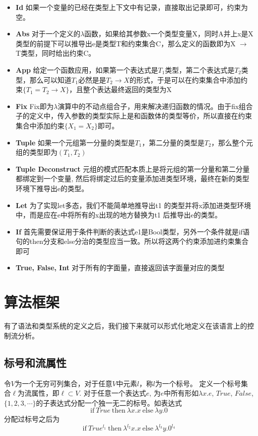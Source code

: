 \documentclass[12pt, titlepage]{article}
\begin{document}
	\begin{itemize}
		\item \textbf{Id} 如果一个变量的已经在类型上下文中有记录，直接取出记录即可，约束为空。
		\item \textbf{Abs} 对于一个定义的$\lambda$函数，如果给其参数x一个类型变量X，同时A并上x是X类型的前提下可以推导出e是类型T和约束集合C，那么定义的函数即为X $\to$ T类型，同时给出约束C。
		\item \textbf{App} 给定一个函数应用，如果第一个表达式是$T_1$类型，第二个表达式是$T_2$类型，那么可以知道$T_1$必然是是$T_2\to X$的形式，于是可以在约束集合中添加约束$\{T_1 = T_2\to X\}$，且整个表达最终返回的类型为X
		\item\textbf{Fix} Fix即为$\lambda$演算中的不动点组合子，用来解决递归函数的情况。由于fix组合子的定义中，传入参数的类型实际上是和函数体的类型等价，所以直接在约束集合中添加约束$\{X_1 = X_2\}$即可。
		\item\textbf{Tuple} 如果一个元组第一分量的类型是$T_1$，第二分量的类型是$T_2$，那么整个元组的类型即为$(T_1, T_2)$
		\item\textbf{Tuple Deconstruct} 元组的模式匹配本质上是将元组的第一分量和第二分量都绑定到一个变量, 然后将绑定过后的变量添加进类型环境，最终在新的类型环境下推导出e的类型。
		\item\textbf{Let} 为了实现let多态，我们不能简单地推导出t1 的类型并将x添加进类型环境中，而是应在e中将所有的x出现的地方替换为t1 后推导出e的类型。
		\item\textbf{If} 首先需要保证用于条件判断的表达式e1是Bool类型，另外一个条件就是if语句的then分支和else分治的类型应当一致。所以将这两个约束添加进约束集合即可
		\item\textbf{True, False, Int} 对于所有的字面量，直接返回该字面量对应的类型
	\end{itemize}
	
\section{算法框架}
有了语法和类型系统的定义之后，我们接下来就可以形式化地定义在该语言上的控制流分析。
\subsection{标号和流属性}
	令$V$为一个无穷可列集合，对于任意$V$中元素$l$，称$l$为一个标号。 定义一个标号集合$\ell$为流属性，即$\ell\subset V$. 对于任意一个表达式$e$, 为$e$中所有形如$\lambda x.e$, $True$, $False$, $\{1, 2, 3,\cdots\}$的子表达式分配一个独一无二的标号。如表达式$$\mathrm{if}\ True\ \mathrm{then}\ \lambda x.x\ \mathrm{else}\ \lambda y.0$$分配过标号之后为$$\mathrm{if}\ True^{l_1}\ \mathrm{then}\ \lambda^{l_2} x.x\ \mathrm{else}\ \lambda^{l_3} y.0^{l_4}$$
\end{document}
